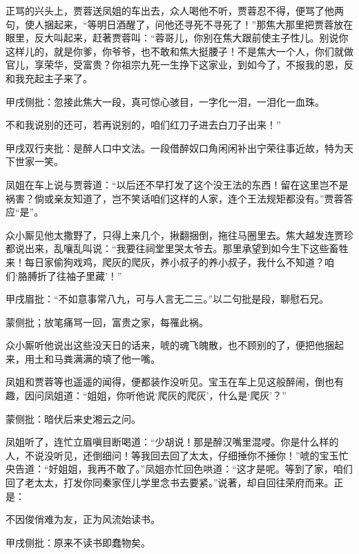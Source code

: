 \begin{parag}


    正骂的兴头上，贾蓉送凤姐的车出去，众人喝他不听，贾蓉忍不得，便骂了他两句，使人捆起来，“等明日酒醒了，问他还寻死不寻死了！”那焦大那里把贾蓉放在眼里，反大叫起来，赶著贾蓉叫：“蓉哥儿，你别在焦大跟前使主子性儿。别说你这样儿的，就是你爹，你爷爷，也不敢和焦大挺腰子！不是焦大一个人，你们就做官儿，享荣华，受富贵？你祖宗九死一生挣下这家业，到如今了，不报我的恩，反和我充起主子来了。\begin{note}甲戌侧批：忽接此焦大一段，真可惊心骇目，一字化一泪，一泪化一血珠。\end{note}不和我说别的还可，若再说别的，咱们红刀子进去白刀子出来！”\begin{note}甲戌双行夹批：是醉人口中文法。一段借醉奴口角闲闲补出宁荣往事近故，特为天下世家一笑。\end{note}凤姐在车上说与贾蓉道：“以后还不早打发了这个没王法的东西！留在这里岂不是祸害？倘或亲友知道了，岂不笑话咱们这样的人家，连个王法规矩都没有。”贾蓉答应“是”。
\end{parag}


\begin{parag}


    众小厮见他太撒野了，只得上来几个，揪翻捆倒，拖往马圈里去。焦大越发连贾珍都说出来，乱嚷乱叫说：“我要往祠堂里哭太爷去。那里承望到如今生下这些畜牲来！每日家偷狗戏鸡，爬灰的爬灰，养小叔子的养小叔子，我什么不知道？咱们‘胳膊折了往袖子里藏’！”\begin{note}甲戌眉批：“不如意事常八九，可与人言无二三。”以二句批是段，聊慰石兄。\end{note}\begin{note}蒙侧批；放笔痛骂一回，富贵之家，每罹此祸。\end{note}众小厮听他说出这些没天日的话来，唬的魂飞魄散，也不顾别的了，便把他捆起来，用土和马粪满满的填了他一嘴。
\end{parag}


\begin{parag}


    凤姐和贾蓉等也遥遥的闻得，便都装作没听见。宝玉在车上见这般醉闹，倒也有趣，因问凤姐道：“姐姐，你听他说‘爬灰的爬灰’，什么是‘爬灰’？”\begin{note}蒙侧批：暗伏后来史湘云之问。\end{note}凤姐听了，连忙立眉嗔目断喝道：“少胡说！那是醉汉嘴里混唚。你是什么样的人，不说没听见，还倒细问！等我回去回了太太，仔细捶你不捶你！”唬的宝玉忙央告道：“好姐姐，我再不敢了。”凤姐亦忙回色哄道：“这才是呢。等到了家，咱们回了老太太，打发你同秦家侄儿学里念书去要紧。”说著，却自回往荣府而来。正是：
\end{parag}

\begin{poem}
    \begin{pl} 不因俊俏难为友，正为风流始读书。\end{pl}
    \begin{note}甲戌侧批：原来不读书即蠢物矣。\end{note}
\end{poem}
